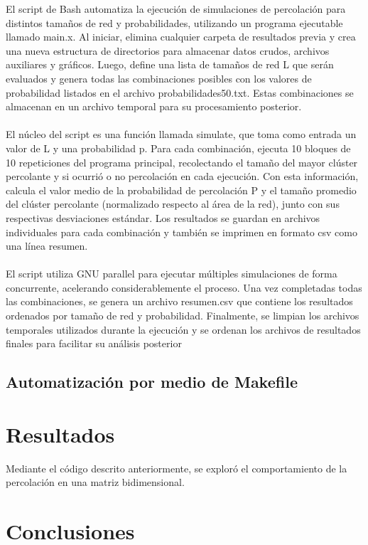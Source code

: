 \documentclass[12pt,a4paper]{article}
\begin{document}
El script de Bash automatiza la ejecución de simulaciones de percolación para distintos tamaños de red y probabilidades, utilizando un programa ejecutable llamado main.x. Al iniciar, elimina cualquier carpeta de resultados previa y crea una nueva estructura de directorios para almacenar datos crudos, archivos auxiliares y gráficos. Luego, define una lista de tamaños de red L que serán evaluados y genera todas las combinaciones posibles con los valores de probabilidad listados en el archivo probabilidades50.txt. Estas combinaciones se almacenan en un archivo temporal para su procesamiento posterior.\\
 \\
El núcleo del script es una función llamada simulate, que toma como entrada un valor de L y una probabilidad p. Para cada combinación, ejecuta 10 bloques de 10 repeticiones del programa principal, recolectando el tamaño del mayor clúster percolante y si ocurrió o no percolación en cada ejecución. Con esta información, calcula el valor medio de la probabilidad de percolación P y el tamaño promedio del clúster percolante (normalizado respecto al área de la red), junto con sus respectivas desviaciones estándar. Los resultados se guardan en archivos individuales para cada combinación y también se imprimen en formato csv como una línea resumen.\\
\\
El script utiliza GNU parallel para ejecutar múltiples simulaciones de forma concurrente, acelerando considerablemente el proceso. Una vez completadas todas las combinaciones, se genera un archivo resumen.csv que contiene los resultados ordenados por tamaño de red y probabilidad. Finalmente, se limpian los archivos temporales utilizados durante la ejecución y se ordenan los archivos de resultados finales para facilitar su análisis posterior
\subsection{Automatización por medio de Makefile}

\section{Resultados}

Mediante el código descrito anteriormente, se exploró el comportamiento de la percolación en una matriz bidimensional.

\section{Conclusiones}

\clearpage



\end{document}
